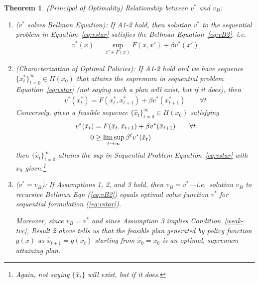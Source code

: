 \documentclass[12pt]{article}
\numberwithin{equation}{section} %
\theoremstyle{plain}
\newtheorem{thm}{Theorem}[section]
\theoremstyle{definition}
\theoremstyle{remark}
\newcommand{\ra}{\rightarrow}
\newcommand{\tinfz}{_{t=0}^\infty}
\begin{document}
\begin{thm}\emph{(Principal of Optimality)}
\label{thm:vstar-solves-bellman}
Relationship between $v^*$ and $v_B$:
\begin{enumerate}[label=\emph{(\roman*)}]
  \item
    \emph{($v^*$ solves Bellman Equation)}:
    If A1-2 hold, then solution $v^*$ to the sequential problem in
    Equation~\ref{eq:vstar} satisfies the Bellman Equation~\ref{eq:vB2}.
    i.e.\
    \begin{align*}
      v^*(x) =
      \sup_{x' \in \Gamma(x)}
      F(x,x') + \beta v^*(x')
    \end{align*}

  \item
    \emph{(Characterization of Optimal Policies)}:
    If A1-2 hold and we have sequence
    $\{x^*_t\}\tinfz\in\Pi(x_0)$ that \emph{attains the supremum} in
    sequential problem Equation~\ref{eq:vstar} (not saying such a plan
    will exist, but if it does), then
    \begin{align*}
      v^*(x^*_t) = F(x^*_t,x^*_{t+1}) + \beta v^*(x^*_{t+1})
      \qquad \forall t
    \end{align*}
    Conversely, given a feasible sequence
    $\{\hat{x}_t\}\tinfz \in\Pi(x_0)$ satisfying
    \begin{align}
      v^*(\hat{x}_t)
      &= F(\hat{x}_t,\hat{x}_{t+1})
        + \beta v^*(\hat{x}_{t+1}) \qquad \forall t\notag\\
      0 &\geq
      \limsup_{t\ra\infty}
      \beta^t v^*(\hat{x}_t)
      \label{weak-tvc}
    \end{align}
    then $\{\hat{x}_t\}\tinfz$ attains the sup in Sequential
    Problem Equation~\ref{eq:vstar} with $x_0$ given.\footnote{%
      Again, not saying $\{\hat{x}_t\}$ will exist, but if it does.}

  \item
    \emph{($v^*=v_B$)}:
    If Assumptions 1, 2, and 3 hold, then $v_B = v^*$---i.e.\ solution
    $v_B$ to recursive Bellman Eqn (\ref{eq:vB2}) equals
    optimal value function $v^*$ for sequential formulation
    (\ref{eq:vstar}).

    Moreover, since $v_B=v^*$ and since Assumption 3 implies
    Condition~\ref{weak-tvc}, Result 2 above tells us that the feasible
    plan generated by policy function $g(x)$ as $\hat{x}_{t+1} =
    g(\hat{x}_t)$ starting from $\hat{x}_0=x_0$ is an optimal,
    supremum-attaining plan.
\end{enumerate}
\end{thm}
\end{document}

